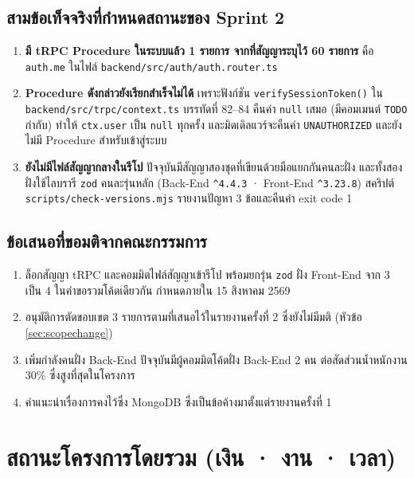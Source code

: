 \subsection*{สามข้อเท็จจริงที่กำหนดสถานะของ Sprint 2}

\begin{enumerate}
  \item \textbf{มี tRPC Procedure ในระบบแล้ว 1 รายการ จากที่สัญญาระบุไว้ 60 รายการ} คือ \texttt{auth.me} ในไฟล์ \texttt{backend/src/auth/auth.router.ts}
  \item \textbf{Procedure ดังกล่าวยังเรียกสำเร็จไม่ได้} เพราะฟังก์ชัน \texttt{verifySessionToken()} ใน \texttt{backend/src/trpc/context.ts} บรรทัดที่ 82–84 คืนค่า \texttt{null} เสมอ (มีคอมเมนต์ \texttt{TODO} กำกับ) ทำให้ \texttt{ctx.user} เป็น \texttt{null} ทุกครั้ง และมิดเดิลแวร์จะคืนค่า \texttt{UNAUTHORIZED} และยังไม่มี Procedure สำหรับเข้าสู่ระบบ
  \item \textbf{ยังไม่มีไฟล์สัญญากลางในรีโป} ปัจจุบันมีสัญญาสองชุดที่เขียนด้วยมือแยกกันคนละฝั่ง และทั้งสองฝั่งใช้ไลบรารี \texttt{zod} คนละรุ่นหลัก (Back-End \texttt{\^{}4.4.3} · Front-End \texttt{\^{}3.23.8}) สคริปต์ \texttt{scripts/check-versions.mjs} รายงานปัญหา 3 ข้อและคืนค่า exit code 1
\end{enumerate}

\subsection*{ข้อเสนอที่ขอมติจากคณะกรรมการ}

\begin{enumerate}
  \item ล็อกสัญญา tRPC และคอมมิตไฟล์สัญญาเข้ารีโป พร้อมยกรุ่น \texttt{zod} ฝั่ง Front-End จาก 3 เป็น 4 ในคำขอรวมโค้ดเดียวกัน กำหนดภายใน 15 สิงหาคม 2569
  \item อนุมัติการตัดขอบเขต 3 รายการตามที่เสนอไว้ในรายงานครั้งที่ 2 ซึ่งยังไม่มีมติ (หัวข้อ \ref{sec:scopechange})
  \item เพิ่มกำลังคนฝั่ง Back-End ปัจจุบันมีผู้คอมมิตโค้ดฝั่ง Back-End 2 คน ต่อสัดส่วนน้ำหนักงาน 30\% ซึ่งสูงที่สุดในโครงการ
  \item คำแนะนำเรื่องการคงไว้ซึ่ง MongoDB ซึ่งเป็นข้อค้างมาตั้งแต่รายงานครั้งที่ 1
\end{enumerate}

\clearpage
\section{สถานะโครงการโดยรวม (เงิน · งาน · เวลา)}

